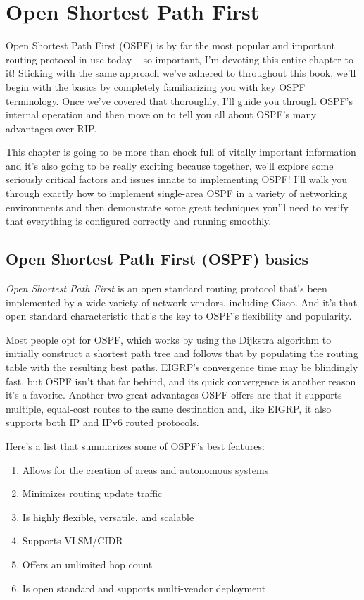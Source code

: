 \chapter{Open Shortest Path First}
\label{chap:ospf}

Open Shortest Path First (OSPF) is by far the most popular and important
routing protocol in use today -- so important, I'm devoting this entire
chapter to it! Sticking with the same approach we've adhered to
throughout this book, we'll begin with the basics by completely
familiarizing you with key OSPF terminology. Once we've covered that
thoroughly, I'll guide you through OSPF's internal operation and then
move on to tell you all about OSPF's many advantages over RIP.

This chapter is going to be more than chock full of vitally important
information and it's also going to be really exciting because together,
we'll explore some seriously critical factors and issues innate to
implementing OSPF! I'll walk you through exactly how to implement
single-area OSPF in a variety of networking environments and then
demonstrate some great techniques you'll need to verify that everything
is configured correctly and running smoothly.



\section{Open Shortest Path First (OSPF) basics}

\emph{Open Shortest Path First} is an open standard routing protocol
that's been implemented by a wide variety of network vendors, including
Cisco. And it's that open standard characteristic that's the key to
OSPF's flexibility and popularity.

Most people opt for OSPF, which works by using the Dijkstra algorithm to
initially construct a shortest path tree and follows that by populating
the routing table with the resulting best paths. EIGRP's convergence
time may be blindingly fast, but OSPF isn't that far behind, and its
quick convergence is another reason it's a favorite.
Another two great advantages OSPF offers are that it supports multiple,
equal-cost routes to the same destination and, like EIGRP, it also supports both IP and IPv6 routed protocols.

Here's a list that summarizes some of OSPF's best features:

\begin{enumerate}
\item
  Allows for the creation of areas and autonomous systems
\item
  Minimizes routing update traffic
\item
  Is highly flexible, versatile, and scalable
\item
  Supports VLSM/CIDR
\item
  \protect\hypertarget{c18.xhtmlux5cux23Page_747}{}{}Offers an unlimited
  hop count
\item
  Is open standard and supports multi-vendor deployment
\end{enumerate}

